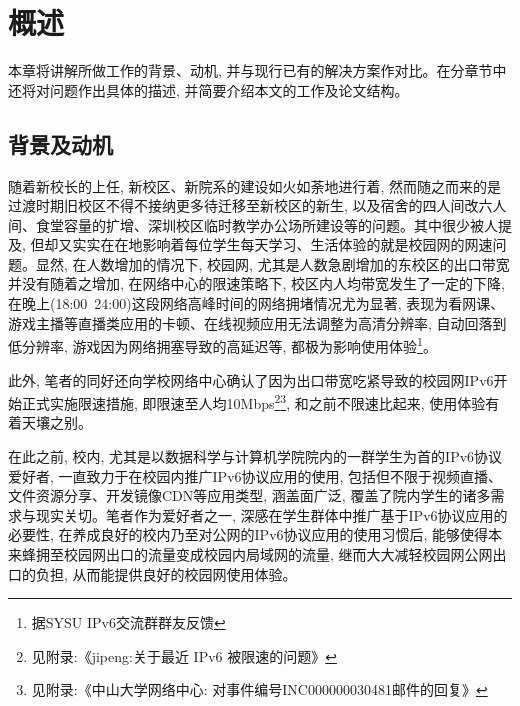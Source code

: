
\chapter{概述}
\label{cha:introduction}

本章将讲解所做工作的背景、动机, 并与现行已有的解决方案作对比。在分章节中还将对问题作出具体的描述, 并简要介绍本文的工作及论文结构。

\section{背景及动机}
\label{sec:background}
随着新校长的上任, 新校区、新院系的建设如火如荼地进行着, 然而随之而来的是过渡时期旧校区不得不接纳更多待迁移至新校区的新生, 以及宿舍的四人间改六人间、食堂容量的扩增、深圳校区临时教学办公场所建设等的问题。其中很少被人提及, 但却又实实在在地影响着每位学生每天学习、生活体验的就是校园网的网速问题。显然, 在人数增加的情况下, 校园网, 尤其是人数急剧增加的东校区的出口带宽并没有随着之增加, 在网络中心的限速策略下, 校区内人均带宽发生了一定的下降, 在晚上(18:00~24:00)这段网络高峰时间的网络拥堵情况尤为显著, 表现为看网课、游戏主播等直播类应用的卡顿、在线视频应用无法调整为高清分辨率, 自动回落到低分辨率, 游戏因为网络拥塞导致的高延迟等, 都极为影响使用体验\footnote{据SYSU IPv6交流群群友反馈}。

此外, 笔者的同好还向学校网络中心确认了因为出口带宽吃紧导致的校园网IPv6开始正式实施限速措施, 即限速至人均10Mbps\footnote{见附录:《jipeng:关于最近 IPv6 被限速的问题》}\footnote{见附录:《中山大学网络中心: 对事件编号INC000000030481邮件的回复》}, 和之前不限速比起来, 使用体验有着天壤之别。

在此之前, 校内, 尤其是以数据科学与计算机学院院内的一群学生为首的IPv6协议爱好者, 一直致力于在校园内推广IPv6协议应用的使用, 包括但不限于视频直播、文件资源分享、开发镜像CDN等应用类型, 涵盖面广泛, 覆盖了院内学生的诸多需求与现实关切。笔者作为爱好者之一, 深感在学生群体中推广基于IPv6协议应用的必要性, 在养成良好的校内乃至对公网的IPv6协议应用的使用习惯后, 能够使得本来蜂拥至校园网出口的流量变成校园内局域网的流量, 继而大大减轻校园网公网出口的负担, 从而能提供良好的校园网使用体验。

